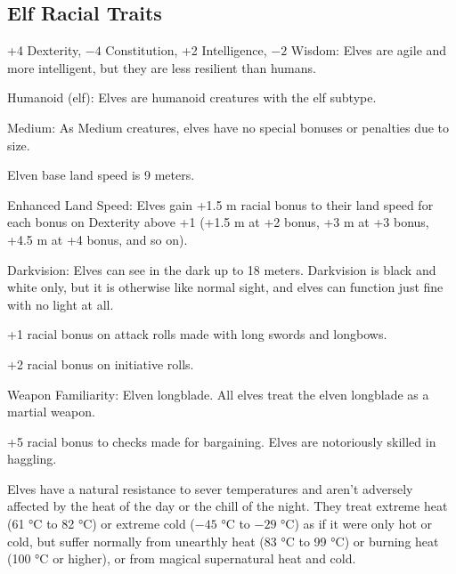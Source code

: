 \subsection{Elf Racial Traits}
\begin{itemize*}
    \item +4 Dexterity, $-4$ Constitution, +2 Intelligence, $-2$ Wisdom: Elves are agile and more intelligent, but they are less resilient than humans.
    \item Humanoid (elf): Elves are humanoid creatures with the elf subtype.
    \item Medium: As Medium creatures, elves have no special bonuses or penalties due to size.
    \item Elven base land speed is 9 meters.
    \item Enhanced Land Speed: Elves gain +1.5 m racial bonus to their land speed for each bonus on Dexterity above +1 (+1.5 m at +2 bonus, +3 m at +3 bonus, +4.5 m at +4 bonus, and so on).
    \item Darkvision: Elves can see in the dark up to 18 meters. Darkvision is black and white only, but it is otherwise like normal sight, and elves can function just fine with no light at all.
    \item +1 racial bonus on attack rolls made with long swords and longbows.
    \item +2 racial bonus on initiative rolls.
    \item Weapon Familiarity: Elven longblade. All elves treat the elven longblade as a martial weapon.
    \item +5 racial bonus to  checks made for bargaining. Elves are notoriously skilled in haggling.
    \item Elves have a natural resistance to sever temperatures and aren't adversely affected by the heat of the day or the chill of the night. They treat extreme heat (61 °C to 82 °C) or extreme cold ($-45$ °C to $-29$ °C) as if it were only hot or cold, but suffer normally from unearthly heat (83 °C to 99 °C) or burning heat (100 °C or higher), or from magical supernatural heat and cold.

\end{itemize*}
